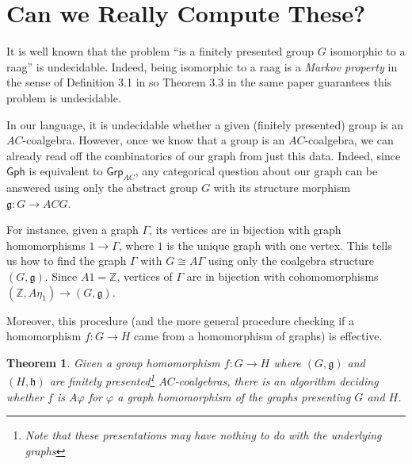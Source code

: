 \documentclass[12pt]{article}
\newtheorem{thm}{Theorem}
\theoremstyle{definition}
\theoremstyle{theorem}
\newcommand*{\catFont}[1]{\mathsf{#1}}
\newcommand{\Grp}{\catFont{Grp}}
\begin{document}
\section{Can we Really Compute These?}
\label{computing}

It is well known that the problem 
``is a finitely presented group $G$ isomorphic to a raag'' 
is undecidable. Indeed, being isomorphic to a raag is a 
\emph{Markov property} in the sense of Definition 3.1 in \cite{millerDecisionProblemsGroups1992}
so Theorem 3.3 in the same paper guarantees this problem is undecidable.

In our language, it is undecidable whether a given
(finitely presented) group is an $AC$-coalgebra. However, once we know
that a group is an $AC$-coalgebra, we can already read off the combinatorics
of our graph from just this data. Indeed, since $\mathsf{Gph}$ is equivalent
to $\Grp_{AC}$, any categorical question about our graph can be answered 
using only the abstract group $G$ with its structure morphism $\mathfrak{g} : G \to ACG$.

For instance, given a graph $\Gamma$, its vertices are in bijection with
graph homomorphisms $1 \to \Gamma$, where $1$ is the unique graph with one vertex.
This tells us how to find the graph $\Gamma$ with $G \cong A\Gamma$ using
only the coalgebra structure $(G,\mathfrak{g})$. Since $A 1 = \mathbb{Z}$,
vertices of $\Gamma$ are in bijection with cohomomorphisms 
$(\mathbb{Z}, A \eta_1) \to (G, \mathfrak{g})$. 

Moreover, this procedure (and the more general procedure checking if a 
homomorphism $f : G \to H$ came from a homomorphism of graphs) is effective.

\begin{thm}
  Given a group homomorphism $f : G \to H$ where $(G,\mathfrak{g})$ and $(H,\mathfrak{h})$
    are finitely presented\footnote{Note that these presentations may have nothing to do with the underlying graphs} 
    $AC$-coalgebras, there is an algorithm deciding 
    whether $f$ is $A \varphi$ for $\varphi$ a graph homomorphism of the graphs 
    presenting $G$ and $H$.
\end{thm}
\end{document}
